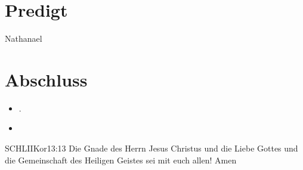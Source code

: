 \documentclass[fontsize=14pt]{mybib}
\newcommand{\Name}{Nathanael}
\begin{document}
\section{Predigt}
    \Name
\section{Abschluss}
\begin{itemize}
    \item {}.
    \item {}
\end{itemize}
\begin{bibelbox}{SCHL}{IIKor}{13:13}
    Die Gnade des Herrn Jesus Christus und die Liebe Gottes und die Gemeinschaft des Heiligen Geistes sei mit euch allen! Amen
\end{bibelbox}
\end{document}
